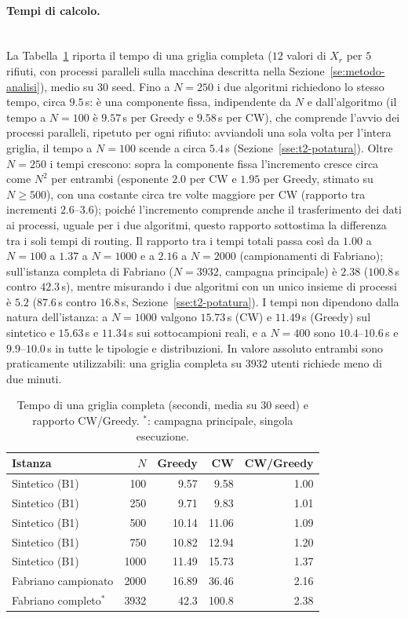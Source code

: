 \paragraph{Tempi di calcolo.}\mbox{}\\
La Tabella~\ref{tab:b1_tempi} riporta il tempo di una griglia completa ($12$ valori di $X_r$ per $5$ rifiuti, con processi paralleli sulla macchina descritta nella Sezione~\ref{se:metodo-analisi}), medio su 30 seed. Fino a $N=250$ i due algoritmi richiedono lo stesso tempo, circa $9.5$\,s: è una componente fissa, indipendente da $N$ e dall'algoritmo (il tempo a $N=100$ è $9.57$\,s per Greedy e $9.58$\,s per CW), che comprende l'avvio dei processi paralleli, ripetuto per ogni rifiuto: avviandoli una sola volta per l'intera griglia, il tempo a $N=100$ scende a circa $5.4$\,s (Sezione~\ref{sse:t2-potatura}). Oltre $N=250$ i tempi crescono: sopra la componente fissa l'incremento cresce circa come $N^2$ per entrambi (esponente $2.0$ per CW e $1.95$ per Greedy, stimato su $N\ge500$), con una costante circa tre volte maggiore per CW (rapporto tra incrementi $2.6$--$3.6$); poiché l'incremento comprende anche il trasferimento dei dati ai processi, uguale per i due algoritmi, questo rapporto sottostima la differenza tra i soli tempi di routing. Il rapporto tra i tempi totali passa così da $1.00$ a $N=100$ a $1.37$ a $N=1000$ e a $2.16$ a $N=2000$ (campionamenti di Fabriano); sull'istanza completa di Fabriano ($N=3932$, campagna principale) è $2.38$ ($100.8$\,s contro $42.3$\,s), mentre misurando i due algoritmi con un unico insieme di processi è $5.2$ ($87.6$\,s contro $16.8$\,s, Sezione~\ref{sse:t2-potatura}). I tempi non dipendono dalla natura dell'istanza: a $N=1000$ valgono $15.73$\,s (CW) e $11.49$\,s (Greedy) sul sintetico e $15.63$\,s e $11.34$\,s sui sottocampioni reali, e a $N=400$ sono $10.4$--$10.6$\,s e $9.9$--$10.0$\,s in tutte le tipologie e distribuzioni. In valore assoluto entrambi sono praticamente utilizzabili: una griglia completa su $3932$ utenti richiede meno di due minuti.

\begin{table}[htbp]
	\centering
	\caption{Tempo di una griglia completa (secondi, media su 30 seed) e rapporto CW/Greedy. $^{*}$: campagna principale, singola esecuzione.}
	\label{tab:b1_tempi}
	\small
	\begin{tabular}{lrrrr}
		\hline
		Istanza & $N$ & Greedy & CW & CW/Greedy \\
		\hline
		Sintetico (B1)      & 100  & 9.57  & 9.58  & 1.00 \\
		Sintetico (B1)      & 250  & 9.71  & 9.83  & 1.01 \\
		Sintetico (B1)      & 500  & 10.14 & 11.06 & 1.09 \\
		Sintetico (B1)      & 750  & 10.82 & 12.94 & 1.20 \\
		Sintetico (B1)      & 1000 & 11.49 & 15.73 & 1.37 \\
		Fabriano campionato & 2000 & 16.89 & 36.46 & 2.16 \\
		Fabriano completo$^{*}$ & 3932 & 42.3 & 100.8 & 2.38 \\
		\hline
	\end{tabular}
\end{table}

